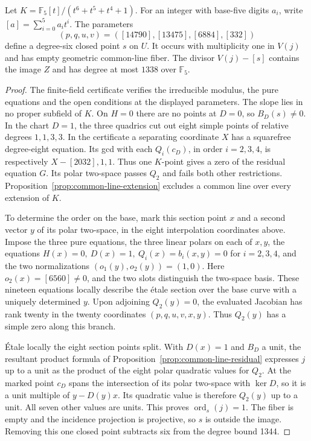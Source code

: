 \begin{proposition}
\label{prop:common-line-excess-point}
Let \(K=\mathbb F_5[t]/(t^6+t^5+t^4+1)\). For an integer with
base-five digits \(a_i\), write \([a]=\sum_{i=0}^5 a_it^i\).
The parameters
\[
      (p,q,u,v)=([14790],[13475],[6884],[332])
\]
define a degree-six closed point \(s\) on \(U\).
It occurs with multiplicity one in \(V(j)\) and has empty geometric
common-line fiber. The divisor \(V(j)-[s]\) contains the image \(Z\)
and has degree at most \(1338\) over \(\mathbb F_5\).
\end{proposition}

\begin{proof}
The finite-field certificate verifies the irreducible modulus, the
pure equations and the open conditions at the displayed parameters.
The slope lies in no proper subfield of \(K\). On \(H=0\) there are
no points at \(D=0\), so \(B_D(s)\ne0\). In the chart \(D=1\), the
three quadrics cut out eight simple points of relative degrees
\(1,1,3,3\). In the certificate a separating coordinate \(X\) has a
squarefree degree-eight equation. Its gcd with each \(Q_i(c_D)\),
in order \(i=2,3,4\), is respectively \(X-[2032],1,1\).
Thus one \(K\)-point gives a zero of the residual equation \(G\).
Its polar two-space passes \(Q_2\) and fails both other restrictions.
Proposition~\ref{prop:common-line-extension} excludes a common line
over every extension of \(K\).

To determine the order on the base, mark this section point \(x\)
and a second vector \(y\) of its polar two-space, in the eight
interpolation coordinates above. Impose the three pure equations,
the three linear polars on each of \(x,y\), the equations
\(H(x)=0,\ D(x)=1,\ Q_i(x)=b_i(x,y)=0\) for \(i=2,3,4\),
and the two normalizations \((o_1(y),o_2(y))=(1,0)\).
Here \(o_2(x)=[6560]\ne0\), and the two slots distinguish the
two-space basis. These nineteen equations locally describe the
étale section over the base curve with a uniquely determined \(y\).
Upon adjoining \(Q_2(y)=0\), the evaluated Jacobian has rank twenty
in the twenty coordinates \((p,q,u,v,x,y)\). Thus \(Q_2(y)\)
has a simple zero along this branch.

Étale locally the eight section points split. With \(D(x)=1\)
and \(B_D\) a unit, the resultant product formula of
Proposition~\ref{prop:common-line-residual} expresses \(j\) up to
a unit as the product of the eight polar quadratic values for \(Q_2\).
At the marked point \(c_D\) spans the intersection of its polar
two-space with \(\ker D\), so it is a unit multiple of
\(y-D(y)x\). Its quadratic value is therefore \(Q_2(y)\) up to a unit.
All seven other values are units. This proves
\(\operatorname{ord}_s(j)=1\). The fiber is empty and the incidence
projection is projective, so \(s\) is outside the image. Removing
this one closed point subtracts six from the degree bound 1344.
\end{proof}

